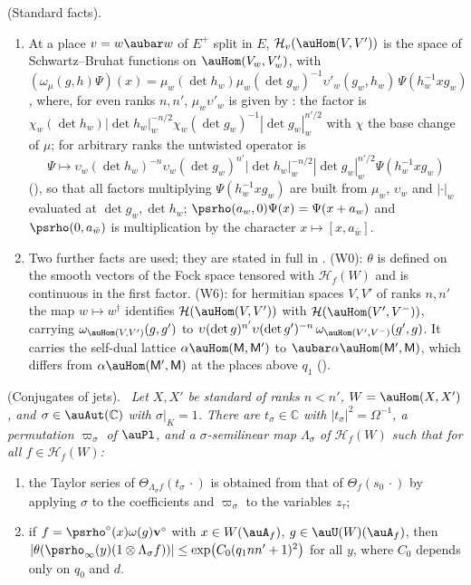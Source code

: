 \documentclass[10pt]{amsart}
\theoremstyle{definition}
\theoremstyle{remark}
\newcommand{\C}{\mathbb C}
\providecommand{\psHS}{\mathcal H}
\providecommand{\psM}{\mathsf M}
\providecommand{\psvac}{\mathbf v}
\newenvironment{quotedthm}[2]{\par\medskip\noindent\begingroup
  \textbf{#1}#2.\ \itshape\ignorespaces}{\endgroup\par\medskip}
\begin{document}
\begin{quotedthm}{\cite[Lemma~5.2]{P49}}{ (Standard facts)}
\begin{enumerate}
$g\in\auU(W)(\auA_f)$ stabilises $L$ then $\omega(g)\psvac_L=\psvac_L$.
\item[(W5)] At a place $v=w\aubar w$ of $E^+$ split in $E$, $\psHS_v(\auHom(V,V'))$ is the space
of Schwartz--Bruhat functions on $\auHom(V_w,V'_w)$, with $(\omega_\mu(g,h)\Psi)(x)=\mu_w(\det h_w)
\mu_w(\det g_w)^{-1}\upsilon'_w(g_w,h_w)\,\Psi(h_w^{-1}xg_w)$, where, for even ranks $n,n'$, $\mu_w\upsilon'_w$ is given by {\cite[(62)]{P49}}: the factor is
$\chi_w(\det h_w)|\det h_w|_w^{-n/2}\chi_w(\det g_w)^{-1}|\det g_w|_w^{n'/2}$ with $\chi$ the base
change of $\mu$; for arbitrary ranks the untwisted operator is
\[\Psi\mapsto\upsilon_w(\det h_w)^{-n}\upsilon_w(\det g_w)^{n'}|\det h_w|_w^{-n/2}|\det g_w|_w^{n'/2}\Psi(h_w^{-1}xg_w)\]
({\cite[Proposition~2.17]{P49}}), so that all factors multiplying $\Psi(h_w^{-1}xg_w)$ are built from $\mu_w$, $\upsilon_w$ and $|\cdot|_w$ evaluated at $\det g_w,\det h_w$; $\psrho(a_w,0)\Psi(x)=\Psi(x+a_w)$
and $\psrho(0,a_{\bar w})$ is multiplication by the character $x\mapsto[x,a_{\bar w}]$.
\item[(W0), (W6)] Two further facts are used; they are stated in full in {\cite[\S5.2.1]{P49}}.
(W0): $\theta$ is defined on the smooth vectors of the Fock space tensored with $\psHS_f(W)$ and is
continuous in the first factor. (W6): for hermitian spaces $V,V'$ of ranks $n,n'$ the map
$w\mapsto w^\dagger$ identifies $\psHS(\auHom(V,V'))$ with $\psHS(\auHom(V',V^-))$, carrying
$\omega_{\auHom(V,V')}(g,g')$ to $\upsilon(\det g)^{n'}\upsilon(\det g')^{-n}\,
\omega_{\auHom(V',V^-)}(g',g)$. It carries the self-dual lattice $\alpha\auHom(\psM,\psM')$ to
$\aubar\alpha\auHom(\psM',\psM)$, which differs from $\alpha\auHom(\psM',\psM)$ at the places above $q_1$
({\cite[Remark~7.18]{P49}}).
\end{enumerate}
\end{quotedthm}

\begin{quotedthm}{\cite[Lemma~5.7]{P49}}{ (Conjugates of jets)}
Let $X,X'$ be standard of ranks $n<n'$, $W=\auHom(X,X')$, and $\sigma\in\auAut(\C)$ with
$\sigma|_K=1$. There are $t_\sigma\in\C$ with $|t_\sigma|^2=\Omega^{-1}$, a permutation
$\varpi_\sigma$ of $\auPl$, and a $\sigma$-semilinear map $\Lambda_\sigma$ of $\psHS_f(W)$ such
that for all $f\in\psHS_f(W)$:
\begin{enumerate}
\item[(i)] the Taylor series of $\Theta_{\Lambda_\sigma f}(t_\sigma\,\cdot)$ is obtained from that
of $\Theta_f(s_0\,\cdot)$ by applying $\sigma$ to the coefficients and $\varpi_\sigma$ to the
variables $z_\tau$;
\item[(ii)] if $f=\psrho^\circ(x)\omega(g)\psvac^\circ$ with $x\in W(\auA_f)$, $g\in\auU(W)
(\auA_f)$, then $|\theta(\psrho_\infty(y)(1\otimes\Lambda_\sigma f))|\le\exp\bigl(C_0(q_1nn'+1)^2
\bigr)$ for all $y$, where $C_0$ depends only on $q_0$ and $d$.
\end{enumerate}
\end{quotedthm}
\end{document}
